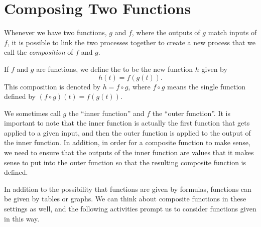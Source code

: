 \documentclass{ximera}
\begin{document}
\section{Composing Two Functions}

Whenever we have two functions, $g$ and $f$, where the outputs of $g$ match inputs of $f$, it is possible to link the two processes together to create a new process that we call the \emph{composition} of $f$ and $g$.

\begin{definition}
If $f$ and $g$ are functions, we define the  to be the new function $h$ given by
$$ h(t) = f(g(t)). $$
This composition is denoted by $h = f \circ g$, where $f \circ g$ means the single function defined by $(f \circ g)(t) = f(g(t))$.
\end{definition}

We sometimes call $g$ the ``inner function'' and $f$ the ``outer function''.  It is important to note that the inner function is actually the first function that gets applied to a given input, and then the outer function is applied to the output of the inner function.  In addition, in order for a composite function to make sense, we need to ensure that the outputs of the inner function are values that it makes sense to put into the outer function so that the resulting composite function is defined.

In addition to the possibility that functions are given by formulas, functions can be given by tables or graphs. We can think about composite functions in these settings as well, and the following activities prompt us to consider functions given in this way.
\end{document}
